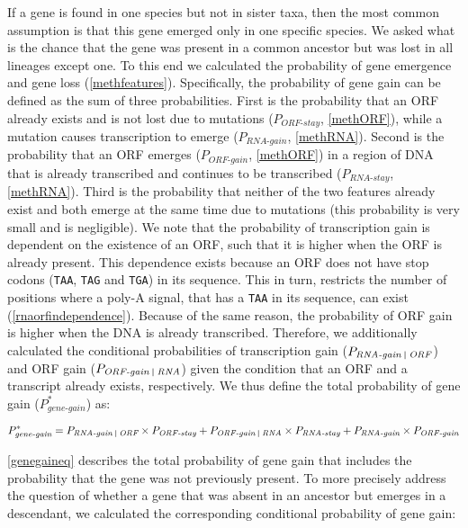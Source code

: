 \documentclass[12pt,a4paper]{article}
\begin{document}
If a gene is found in one species but not in sister taxa, then the most common assumption is that this gene emerged only in one specific species. We asked what is the chance that the gene was present in a common ancestor but was lost in all lineages except one. To this end we calculated the probability of gene emergence and gene loss (\autoref{methfeatures}). Specifically, the probability of gene gain can be defined as the sum of three probabilities. First is the probability that an ORF already exists and is not lost due to mutations ($P_\textit{ORF-stay}$, \autoref{methORF}), while a mutation causes transcription to emerge ($P_\textit{RNA-gain}$, \autoref{methRNA}). Second is the probability that an ORF emerges ($P_\textit{ORF-gain}$, \autoref{methORF}) in a region of DNA that is already transcribed and continues to be transcribed ($P_\textit{RNA-stay}$, \autoref{methRNA}). Third is the probability that neither of the two features already exist and both emerge at the same time due to mutations (this probability is very small and is negligible). We note that the probability of transcription gain is dependent on the existence of an ORF, such that it is higher when the ORF is already present. This dependence exists because an ORF does not have stop codons (\texttt{TAA}, \texttt{TAG} and \texttt{TGA}) in its sequence. This in turn, restricts the number of positions where a poly-A signal, that has a \texttt{TAA} in its sequence, can exist (\autoref{rnaorfindependence}). Because of the same reason, the probability of ORF gain is higher when the DNA is already transcribed. Therefore, we additionally calculated the conditional probabilities of transcription gain ($P_\textit{RNA-gain \vline\ ORF}$) and ORF gain ($P_\textit{ORF-gain \vline\ RNA}$) given the condition that an ORF and a transcript already exists, respectively. We thus define the total probability of gene gain ($P_\textit{gene-gain}^*$) as:

\begin{equation}
P_\textit{gene-gain}^* = P_\textit{RNA-gain \vline\ ORF} \times P_\textit{ORF-stay} + P_\textit{ORF-gain \vline\ RNA} \times P_\textit{RNA-stay} + P_\textit{RNA-gain}\times P_\textit{ORF-gain}
\label{genegaineq}
\end{equation}

\autoref{genegaineq} describes the total probability of gene gain that includes the probability that the gene was not previously present. To more precisely address the question of whether a gene that was absent in an ancestor but emerges in a descendant, we calculated the corresponding conditional probability of gene gain:
\end{document}
